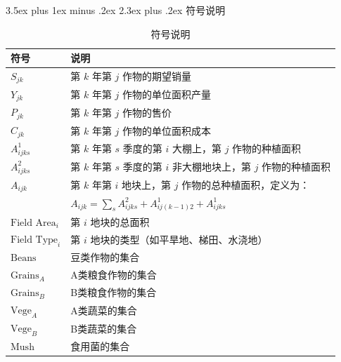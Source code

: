 \documentclass[12pt,a4paper]{nmmcm}
\makeatletter
\renewcommand\section{\@startsection{section}{1}{0pt}%
    {3.5ex plus 1ex minus .2ex}%
    {2.3ex plus .2ex}%
    {\normalfont\LARGE\bfseries}}
\makeatother
\begin{document}
\section{符号说明}
\begin{table}[htbp]
  \centering
  \caption{符号说明}
  \renewcommand{\arraystretch}{1.2}
  \setlength{\tabcolsep}{10pt}
  \begin{tabular}{p{3cm} | p{10cm}}
    \hline
    \hline
    \textbf{符号}           & \textbf{说明}                                                 \\
    \hline
    $S_{jk}$              & 第 $k$ 年第 $j$ 作物的期望销量                                        \\
    $Y_{jk}$              & 第 $k$ 年第 $j$ 作物的单位面积产量                                      \\
    $P_{jk}$              & 第 $k$ 年第 $j$ 作物的售价                                          \\
    $C_{jk}$              & 第 $k$ 年第 $j$ 作物的单位面积成本                                      \\
    $A^1_{ijks}$          & 第 $k$ 年第 $s$ 季度的第 $i$ 大棚上，第 $j$ 作物的种植面积                     \\
    $A^2_{ijks}$          & 第 $k$ 年第 $s$ 季度的第 $i$ 非大棚地块上，第 $j$ 作物的种植面积                  \\
    $A_{ijk}$             & 第 $k$ 年第 $i$ 地块上，第 $j$ 作物的总种植面积，定义为：                        \\
                          & $A_{ijk} = \sum_s A^2_{ijks} + A^1_{ij(k-1)2} + A^1_{ijks}$ \\
    $\text{Field Area}_i$ & 第 $i$ 地块的总面积                                                \\
    $\text{Field Type}_i$ & 第 $i$ 地块的类型（如平旱地、梯田、水浇地）                                    \\
    $\text{Beans}$        & 豆类作物的集合                                                     \\
    $\text{Grains}_A$     & A类粮食作物的集合                                                   \\
    $\text{Grains}_B$     & B类粮食作物的集合                                                   \\
    $\text{Vege}_A$       & A类蔬菜的集合                                                     \\
    $\text{Vege}_B$       & B类蔬菜的集合                                                     \\
    $\text{Mush}$         & 食用菌的集合                                                      \\
    \hline
    \hline
  \end{tabular}
\end{table}
\end{document}
